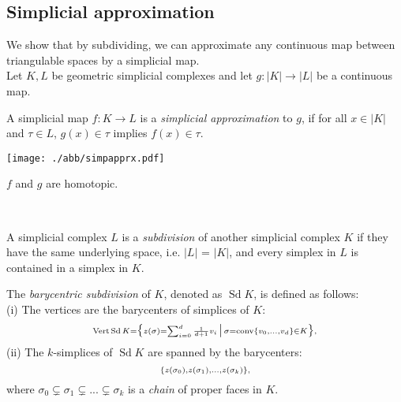 \begin{multicols*}{3}
\subsection{Simplicial approximation}
{\myfont We show that by subdividing, we can approximate any continuous map between triangulable spaces by a simplicial map.} \\
Let $K,L$ be geometric simplicial complexes and let $g:|K|\to |L|$ be a continuous map.
\vspace{-0.5pc}
\begin{definition}
A simplicial map $f:K\to L$ is a \emph{simplicial approximation} to $g$, if for all $x \in |K|$ and $\tau \in L$, $g(x) \in \tau$ implies $f(x)\in \tau$.
\begin{center}
\vspace{-1.2pc}
\texttt{[image: ./abb/simpapprx.pdf]}
\end{center}
\end{definition}
\rspace\vspace{-0.5pc}
\begin{remark}
$f$ and $g$ are homotopic.
\end{remark}
\rspace
\drawaline\\\vspace{-0.6pc}
\begin{defi}[Subdivision]
{A simplicial complex $L$ is a \emph{subdivision} of another simplicial complex $K$ if they have the same underlying space, i.e. $|L|$ = $|K|$, and every simplex in $L$ is contained in a simplex in $K$.}
\end{defi}
\rspace
\begin{example}
The \emph{barycentric subdivision} of  $K$, denoted as $\operatorname{Sd} K$, is defined as follows:\\
(i) The vertices are the barycenters of simplices of $K$:\vspace{-0.35pc}
$${\scriptstyle \vertex \operatorname{Sd} K = \big\{ z(\sigma) = \sum_{i=0}^d \frac{1}{d+1} v_i \, \big|\, \sigma = \operatorname{conv} \{v_0,...,v_d\}\in K \big\},} \vspace{-0.39pc}$$ 
(ii) The $k$-simplices of $\operatorname{Sd} K$ are spanned by the barycenters:\vspace{-0.4pc}
$$ {\scriptstyle \{z(\sigma_0), z(\sigma_1),...,z(\sigma_k) \},}\vspace{-0.4pc}$$
where $\sigma_0 \subsetneq \sigma_1 \subsetneq ... \subsetneq \sigma_k$ is a \emph{chain} of proper faces in $K$.

\end{example}
\end{multicols*}
